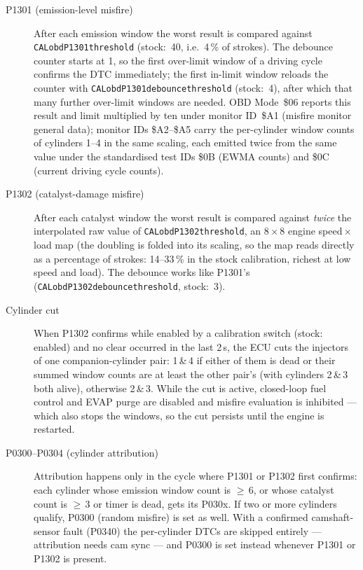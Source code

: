 \documentclass[a4paper,11pt]{article}
\renewcommand{\_}{\oldunderscore\allowbreak}
\begin{document}
\begin{description}
  \item[P1301 (emission-level misfire)] After each emission window the worst
        result is compared against \texttt{CAL\_obd\_P1301\_threshold}
        (stock:~40, i.e.\ 4\,\% of strokes). The debounce counter starts at 1,
        so the first over-limit window of a driving cycle confirms the DTC
        immediately; the first in-limit window reloads the counter with
        \texttt{CAL\_obd\_P1301\_debounce\_threshold} (stock:~4), after which
        that many further over-limit windows are needed. OBD Mode~\$06 reports
        this result and limit multiplied by ten under monitor ID~\$A1 (misfire
        monitor general data); monitor IDs \$A2--\$A5 carry the per-cylinder
        window counts of cylinders 1--4 in the same scaling, each emitted
        twice from the same value under the standardised test IDs \$0B (EWMA
        counts) and \$0C (current driving cycle counts).

  \item[P1302 (catalyst-damage misfire)] After each catalyst window the worst
        result is compared against \emph{twice} the interpolated raw value of
        \texttt{CAL\_obd\_P1302\_threshold}, an 8\,$\times$\,8 engine
        speed\,$\times$\,load map (the doubling is folded into its scaling, so
        the map reads directly as a percentage of strokes: 14--33\,\% in the
        stock calibration, richest at low speed and load). The debounce works
        like P1301's (\texttt{CAL\_obd\_P1302\_debounce\_threshold}, stock:~3).

  \item[Cylinder cut] When P1302 confirms while enabled by a calibration
        switch (stock: enabled) and no clear occurred in the last 2\,s, the
        ECU cuts the injectors of one companion-cylinder pair: 1\,\&\,4 if
        either of them is dead or their summed window counts are at least the
        other pair's (with cylinders 2\,\&\,3 both alive), otherwise
        2\,\&\,3. While the cut is active, closed-loop fuel control and EVAP
        purge are disabled and misfire evaluation is inhibited --- which also
        stops the windows, so the cut persists until the engine is restarted.

  \item[P0300--P0304 (cylinder attribution)] Attribution happens only in the
        cycle where P1301 or P1302 first confirms: each cylinder whose
        emission window count is $\geq$\,6, or whose catalyst count is
        $\geq$\,3 or timer is dead, gets its P030x. If two or more cylinders
        qualify, P0300 (random misfire) is set as well. With a confirmed
        camshaft-sensor fault (P0340) the per-cylinder DTCs are skipped
        entirely --- attribution needs cam sync --- and P0300 is set instead
        whenever P1301 or P1302 is present.
\end{description}
\end{document}
